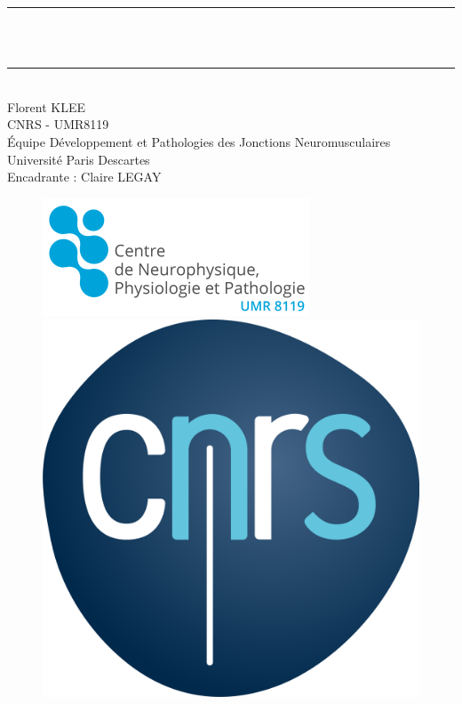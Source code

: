 \begin{center}
\rule{\textwidth}{0.5pt} \\[0.4cm]
{\huge \bfseries \titredoc\\[0.4cm]} %
\rule{\textwidth}{0.5pt} \\[1.5cm]

Florent KLEE \\
CNRS - UMR8119\\
Équipe Développement et Pathologies des Jonctions Neuromusculaires\\
Université Paris Descartes\\
Encadrante : Claire LEGAY\\
\vspace{1cm}

\begin{figure}[!b] %
	\centering
	\begin{minipage}{0.48\textwidth}
		\raggedright %
		\includegraphics[height=0.1\textheight]{./Images/Logo_UMR8119.png}
	\end{minipage}%
	\begin{minipage}{0.48\textwidth}
		\raggedleft %
		\includegraphics*[height=0.1\textheight]{./Images/Logo_CNRS.png}
	\end{minipage}%
\end{figure}

\end{center}